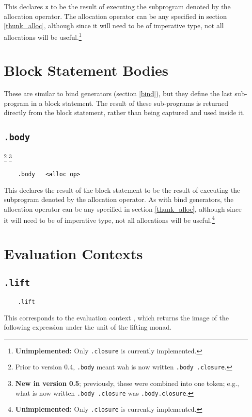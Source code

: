 \documentclass{report}
\newcommand\stringcode[1]{\texttt{#1}}
\newcommand\unimpl[1]{\footnote{\textbf{Unimplemented: }#1}}
\newcommand\old[2]{\footnote{Prior to version #1, #2}}
\newcommand\new[2]{\footnote{\textbf{New in version #1}; previously, #2}}
\begin{document}
This declares \stringcode{x} to be the result of executing the subprogram denoted by the allocation operator.
The allocation operator can be any specified in section \ref{thunk_alloc},
although since it will need to be of imperative type, not all allocations will be useful.\unimpl{Only \stringcode{.closure} is currently implemented.}

\section{Block Statement Bodies}
\label{body}

These are similar to bind generators (section \ref{bind}), but they define the last sub-program in a block statement.
The result of these sub-programs is returned directly from the block statement, rather than being captured and used inside it.

\subsection{\stringcode{.body}}
\old{0.4}{\stringcode{.body} meant wah is now written \stringcode{.body	.closure}.}
\new{0.5}{these were combined into one token; e.g., what is now written \stringcode{.body	.closure} was \stringcode{.body.closure}.}

\begin{verbatim}
	.body	<alloc op>
\end{verbatim}

This declares the result of the block statement to be the result of executing the subprogram denoted by the allocation operator.
As with bind generators, the allocation operator can be any specified in section \ref{thunk_alloc},
although since it will need to be of imperative type, not all allocations will be useful.\unimpl{Only \stringcode{.closure} is currently implemented.}

\section{Evaluation Contexts}
\label{cont_push}

\subsection{\stringcode{.lift}}

\begin{verbatim}
	.lift
\end{verbatim}

This corresponds to the evaluation context \<\lfloor\bullet\rfloor\>, which returns the image of the following expression under the unit of the lifting monad.
\end{document}
